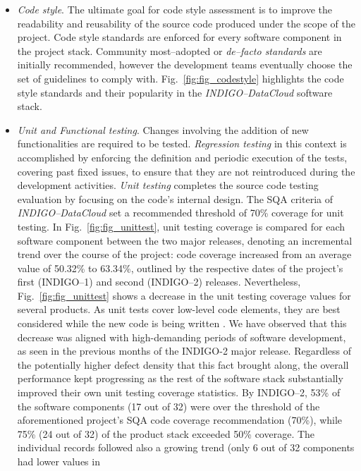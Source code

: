 \documentclass[journal]{IEEEtran}
\begin{document}
\begin{itemize}
\item \textit{Code style}.
The ultimate goal for code style assessment is to improve the readability and reusability of the
source code produced under the scope of the
project. Code style standards are enforced for every software component in the project stack. Community
most--adopted or \textit{de--facto standards} are initially recommended, however the development teams eventually
choose the set of guidelines to comply with. Fig.~\ref{fig:fig_codestyle} highlights the code style standards and
their popularity
in the {\sl INDIGO--DataCloud} software stack.

\item \textit{Unit and Functional testing}.
Changes involving the addition of new functionalities are required to be tested. \textit{Regression
testing} in this context is accomplished by enforcing the definition and periodic execution
of the tests, covering past fixed issues, to ensure that they are not reintroduced during the development
activities. \textit{Unit testing} completes the source code testing evaluation by focusing on the code's
internal design. The SQA criteria of {\sl INDIGO--DataCloud} set a recommended threshold of 70\% coverage
for unit testing. In Fig.~\ref{fig:fig_unittest}, unit testing coverage is compared for each software
component between the two major releases, denoting an incremental trend over the course of the project:
code coverage increased from an average value of 50.32\% to 63.34\%, outlined by the respective dates of
the project's first (INDIGO--1) and second (INDIGO--2) releases. Nevertheless, Fig.~\ref{fig:fig_unittest}
shows a decrease in the unit testing coverage values for several products. As unit tests cover low-level
code elements, they are best considered while the new code is being written \cite{unit-test-frameworks}.
We have observed that this decrease was aligned with high-demanding periods of software development, as
seen in the previous months of the INDIGO-2 major release. Regardless of the potentially higher defect
density that this fact brought along, the overall performance kept progressing as the rest of the software
stack substantially improved their own unit testing coverage statistics. By INDIGO--2, 53\% of the software
components (17 out of 32) were over the threshold of the aforementioned project's SQA code coverage
recommendation (70\%), while 75\% (24 out of 32) of the product stack exceeded 50\% coverage.
The individual records followed also a growing trend (only 6 out of 32 components had lower values in

\end{itemize}
\end{document}
